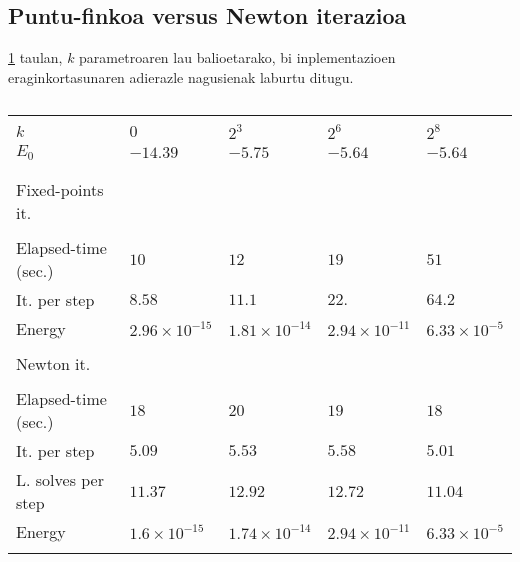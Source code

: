 \subsection{Puntu-finkoa versus Newton iterazioa}


\ref{tab:fp1} taulan, $k$ parametroaren lau balioetarako, bi inplementazioen eraginkortasunaren adierazle nagusienak laburtu ditugu.

\begin{table}[h!]
\caption[Puntu-finkoa versus Newton iterazioa] 
{\small}
\label{tab:fp1}       %
\centering
{%
\begin{tabular}{ l l l l l } 
 \hline
\\
 $k$               & $0$  & $2^3$ & $2^6$ & $2^8$ \\
 $E_0$           & $-14.39$  & $-5.75$ & $-5.64$ & $-5.64$ \\ 
\\
 \hline
\\
 Fixed-points it.&           &         &         &         \\
 \cline{1-1}     &           &         &         &         \\
 Elapsed-time (sec.)    & $10$      & $12$    & $19$    & $51$    \\ 
 It. per step    & $8.58$    & $11.1$  & $22.$  & $64.2$  \\
 Energy          & $2.96\times 10^{-15}$ & $1.81\times 10^{-14}$ & $2.94\times 10^{-11}$ & $6.33\times 10^{-5}$ \\
 \\
 Newton it.            &           &         &         &         \\
 \cline{1-1}           &           &         &         &         \\
 Elapsed-time (sec.)   & $18$      & $20$    & $19$    & $18$     \\
 It. per step          & $5.09$    & $5.53$  & $5.58$  & $5.01$   \\
 L. solves per step    & $11.37$   & $12.92$  & $12.72$  & $11.04$ \\
 Energy                & $1.6\times 10^{-15}$ & $1.74\times 10^{-14}$ & $2.94\times 10^{-11}$ & $6.33\times 10^{-5}$ \\   
 \\  
   \hline
 \end{tabular}}
\end{table}

